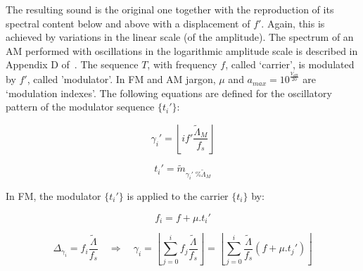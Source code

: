 
The resulting sound is the original one together with the
reproduction of its spectral content below and above with a displacement of $f'$.
Again, this is achieved by variations in the linear scale (of the amplitude).
The spectrum of an AM performed with oscillations in the logarithmic amplitude scale is described in Appendix D of~\cite{dissertacao}.
The sequence $T$, with frequency $f$, called `carrier', is modulated by
$f'$, called 'modulator'. In FM and AM jargon, $\mu$ and
$a_{max}=10^{\frac{V_{dB}}{20}}$ are `modulation indexes'.
The following equations are defined for the oscillatory pattern of the modulator sequence $\{t_i'\}$:

\begin{equation}\label{fmGammaAux}
\gamma_i'=\left \lfloor i f' \frac{\widetilde{\Lambda}_M}{f_s} \right \rfloor
\end{equation}

\begin{equation}\label{fmAux}
t_i'=\widetilde{m}_{\gamma_i' \;\% \widetilde{\Lambda}_M}
\end{equation}

In FM, the modulator $\{t_i'\}$ is applied to the carrier $\{t_i\}$ by:

\begin{equation}\label{fmF}
f_i=f + \mu . t_i'
\end{equation}

\begin{equation}\label{fmGamma}
\Delta_{\gamma_i}=f_i\frac{\widetilde{\Lambda}}{f_s} \quad \Rightarrow \quad \gamma_i = \left \lfloor \sum_{j=0}^{i} f_j \frac{\widetilde{\Lambda}}{f_s} \right \rfloor = \left \lfloor \sum_{j=0}^{i} \frac{\widetilde{\Lambda}}{f_s}(f+\mu . t_j') \right\rfloor
\end{equation}

